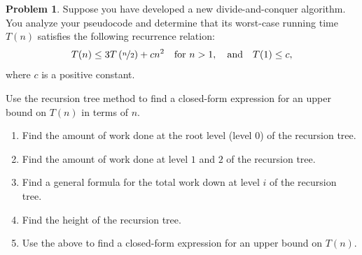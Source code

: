 \documentclass[10pt]{article}
\theoremstyle{definition}
\newtheorem{problem}{Problem}
\newenvironment{solution}{\begin{proof}[Solution]}{\end{proof}}
\begin{document}

\newpage
\begin{problem}
    Suppose you have developed a new divide-and-conquer algorithm. You analyze your pseudocode and determine that its worst-case running time $T(n)$ satisfies the following recurrence relation:
    \[
    T(n) \leq 3T\left(\nicefrac{n}{2}\right) + cn^2 \quad \text{for } n > 1, \quad \text{and} \quad T(1) \leq c,
    \]
    where $c$ is a positive constant. 

    \noindent Use the recursion tree method to find a closed-form expression for an upper bound on $T(n)$ in terms of $n$. 
    \begin{enumerate}[label=(\alph*)]
        \item Find the amount of work done at the root level (level 0) of the recursion tree.
        \item Find the amount of work done at level $1$ and $2$ of the recursion tree.
        \item Find a general formula for the total work down at level $i$ of the recursion tree.
        \item Find the height of the recursion tree.
        \item Use the above to find a closed-form expression for an upper bound on $T(n)$.
    \end{enumerate}
\end{problem}

\end{document}
